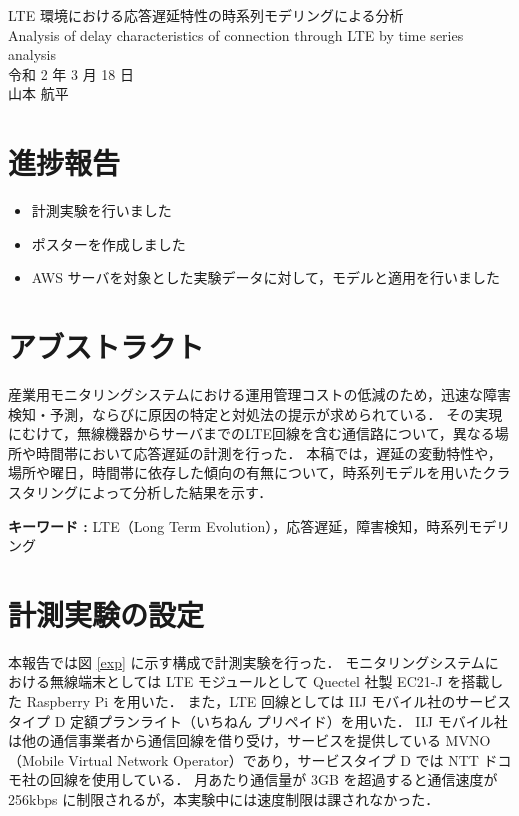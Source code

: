 \documentclass[a4j]{jarticle}
\begin{document}
\begin{table}[t]
\begin{center}
{\large LTE 環境における応答遅延特性の時系列モデリングによる分析}\\
Analysis of delay characteristics of connection through LTE by time series analysis\\
令和 2 年 3 月 18 日\\
山本 航平
\end{center}
\end{table}

\section{進捗報告}
\begin{itemize}
\item 計測実験を行いました
\item ポスターを作成しました
\item AWS サーバを対象とした実験データに対して，モデルと適用を行いました
\end{itemize}

\section{アブストラクト}
産業用モニタリングシステムにおける運用管理コストの低減のため，迅速な障害検知・予測，ならびに原因の特定と対処法の提示が求められている．
その実現にむけて，無線機器からサーバまでのLTE回線を含む通信路について，異なる場所や時間帯において応答遅延の計測を行った．
本稿では，遅延の変動特性や，場所や曜日，時間帯に依存した傾向の有無について，時系列モデルを用いたクラスタリングによって分析した結果を示す．

\textbf{キーワード : }LTE（Long Term Evolution），応答遅延，障害検知，時系列モデリング\\
\section{計測実験の設定}
本報告では図 \ref{exp} に示す構成で計測実験を行った．
モニタリングシステムにおける無線端末としては LTE モジュールとして Quectel 社製 EC21-J を搭載した Raspberry Pi を用いた．
また，LTE 回線としては IIJ モバイル社のサービスタイプ D 定額プランライト（いちねん プリペイド）を用いた．
IIJ モバイル社は他の通信事業者から通信回線を借り受け，サービスを提供している MVNO（Mobile Virtual Network Operator）であり，サービスタイプ D では NTT ドコモ社の回線を使用している．
月あたり通信量が 3GB を超過すると通信速度が 256kbps に制限されるが，本実験中には速度制限は課されなかった．
\end{document}
